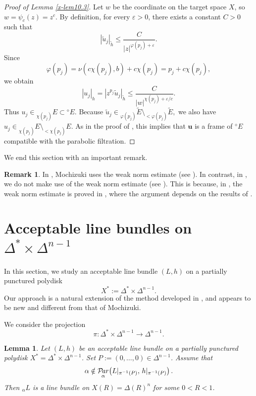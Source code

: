 \documentclass[12pt,twoside]{amsart}
\DeclareMathOperator{\Par}{\mathcal{P}\!\it{ar}}
\newtheorem{lem}[thm]{Lemma}
\theoremstyle{definition}
\newtheorem{rem}[thm]{Remark}
\begin{document}
\begin{proof}[Proof of Lemma \ref{x-lem10.3}]
Let $w$ be the coordinate on the target space $X$, so $w=\psi_c(z)=z^c$.  
By definition, for every $\varepsilon>0$, 
there exists a constant $C>0$ such that
\[
|\widetilde u_j|_{\widetilde h}
\le
\frac{C}{|z|^{\varphi(p_j)+\varepsilon}}.
\]
Since
\[
\varphi(p_j)
=
\nu(c\chi(p_j),b)+c\chi(p_j)
=
p_j + c\chi(p_j),
\]
we obtain
\[
|u_j|_h
=
|z^{p_j}\widetilde u_j|_{\widetilde h}
\le
\frac{C}{|w|^{\chi(p_j)+\varepsilon/c}}.
\]
Thus $u_j\in {}_{\chi(p_j)}E\subset {}^\diamond\!E$.  
Because 
\(
\widetilde u_j \in {}_{\varphi(p_j)}\widetilde E
\setminus {}_{<\varphi(p_j)}\widetilde E,
\)
we also have 
\(
u_j\in {}_{\chi(p_j)}E\setminus {}_{<\chi(p_j)}E.
\)
As in the proof of \cite[Lemma~11.3]{fujino-fujisawa-ono}, 
this implies that $\bm u$ is a frame of ${}^\diamond\!E$ 
compatible with the parabolic filtration.
\end{proof}

We end this section with an important remark.

\begin{rem}\label{x-rem10.4}
In \cite[21.4.2]{mochizuki4}, Mochizuki uses the weak norm estimate 
(see \cite[Theorem~21.3.2]{mochizuki4}).  
In contrast, in \cite[Section~11]{fujino-fujisawa-ono}, 
we do not make use of the weak norm estimate 
(see \cite[Theorem~1.13]{fujino-fujisawa-ono}).  
This is because, in \cite{fujino-fujisawa-ono}, the weak norm estimate is proved in 
\cite[Section~13]{fujino-fujisawa-ono}, 
where the argument depends on the results of 
\cite[Section~11]{fujino-fujisawa-ono}.
\end{rem}

\section{Acceptable line bundles on $\Delta^*\times \Delta^{n-1}$}
\label{x-sec11}

In this section, we study an acceptable line 
bundle $(L,h)$ on a partially punctured polydisk 
\[
X^* := \Delta^* \times \Delta^{n-1}.
\]
Our approach is a natural extension of the method developed in
\cite{fujino-fujisawa-ono}, and appears to 
be new and different from that of
Mochizuki.

\medskip

We consider the projection
\[
\pi \colon \Delta^*\times \Delta^{n-1} \to \Delta^{n-1}.
\]

\begin{lem}\label{x-lem11.1}
Let $(L,h)$ be an acceptable line bundle on a partially punctured 
polydisk $X^*=\Delta^*\times \Delta^{n-1}$.
Set $P:=(0,\ldots,0)\in \Delta^{n-1}$.
Assume that
\begin{equation}\label{x-eq11.1}
\alpha \notin \Par_\alpha\!\left(L|_{\pi^{-1}(P)},\, h|_{\pi^{-1}(P)}\right).
\end{equation}
Then ${}_\alpha L$ is a line bundle on $X(R)=\Delta(R)^n$ for some $0<R<1$.
\end{lem}
\end{document}
